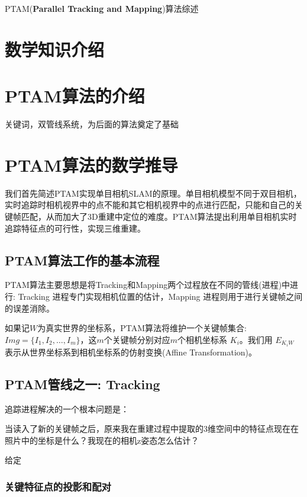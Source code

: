\documentclass[12pt]{article}
\def \itW{\mathit{W}}
\def \itK{\mathit{K}}
\begin{document}
\begin{center}
PTAM(\textbf{Parallel Tracking and Mapping})算法综述
\end{center}

\section{数学知识介绍}

\section{PTAM算法的介绍}
关键词，双管线系统，为后面的算法奠定了基础

\section{PTAM算法的数学推导}
我们首先简述PTAM实现单目相机SLAM的原理。单目相机模型不同于双目相机，实时追踪时相机视界中的点不能和其它相机视界中的点进行匹配，只能和自己的关键帧匹配，从而加大了3D重建中定位的难度。PTAM算法提出利用单目相机实时追踪特征点的可行性，实现三维重建。

\subsection{PTAM算法工作的基本流程}
PTAM算法主要思想是将Tracking和Mapping两个过程放在不同的管线(进程)中进行: Tracking 进程专门实现相机位置的估计，Mapping 进程则用于进行关键帧之间的误差消除。

如果记$\itW$为真实世界的坐标系，PTAM算法将维护一个关键帧集合: $Img=\{I_1,I_2,\ldots,I_m\}$，这\(m\)个关键帧分别对应\(m\)个相机坐标系 $\itK_i$。我们用 $E_{\itK_i\itW}$ 表示从世界坐标系到相机坐标系的仿射变换(Affine Transformation)。

\subsection{PTAM管线之一: Tracking}

%
%
追踪进程解决的一个根本问题是：

当读入了新的关键帧之后，原来我在重建过程中提取的3维空间中的特征点现在在照片中的坐标是什么？我现在的相机z姿态怎么估计？ 

给定 

\subsubsection{关键特征点的投影和配对}
\end{document}
